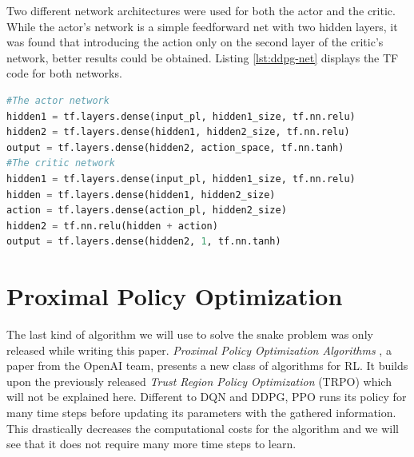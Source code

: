 Two different network architectures were used for both the actor and the critic.
While the actor's network is a simple feedforward net with two hidden layers, it was found that introducing the action only on the second layer of the critic's network, better results could be obtained.
Listing \ref{lst:ddpg-net} displays the TF code for both networks.

\begin{lstlisting}[language=Python, caption=Python code for the DDPG networks, captionpos=b, label=lst:ddpg-net]
#The actor network
hidden1 = tf.layers.dense(input_pl, hidden1_size, tf.nn.relu)
hidden2 = tf.layers.dense(hidden1, hidden2_size, tf.nn.relu)
output = tf.layers.dense(hidden2, action_space, tf.nn.tanh)
#The critic network
hidden1 = tf.layers.dense(input_pl, hidden1_size, tf.nn.relu)
hidden = tf.layers.dense(hidden1, hidden2_size)
action = tf.layers.dense(action_pl, hidden2_size)
hidden2 = tf.nn.relu(hidden + action)
output = tf.layers.dense(hidden2, 1, tf.nn.tanh)
\end{lstlisting}


\section{Proximal Policy Optimization}

The last kind of algorithm we will use to solve the snake problem was only released while writing this paper.
\emph{Proximal Policy Optimization Algorithms} \cite{ppo}, a paper from the OpenAI team, presents a new class of algorithms for RL.
It builds upon the previously released \emph{Trust Region Policy Optimization} (TRPO) which will not be explained here.
Different to DQN and DDPG, PPO runs its policy for many time steps before updating its parameters with the gathered information.
This drastically decreases the computational costs for the algorithm and we will see that it does not require many more time steps to learn.

